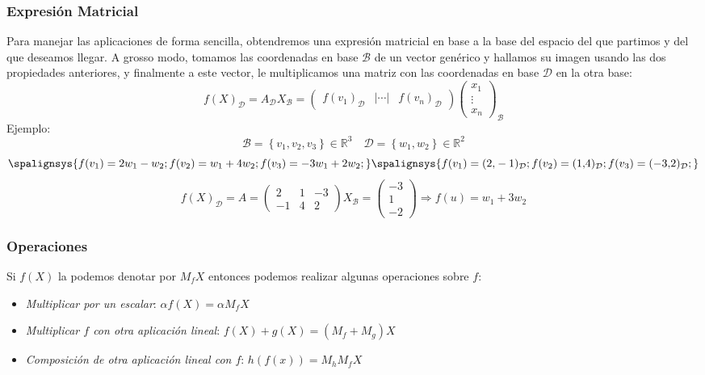 \subsubsection{Expresión Matricial}
Para manejar las aplicaciones de forma sencilla, obtendremos una expresión matricial en base a la base del espacio del que partimos y del que deseamos llegar. A grosso modo, tomamos las coordenadas en base \(\mathcal{B}\) de un vector genérico y hallamos su imagen usando las dos propiedades anteriores, y finalmente a este vector, le multiplicamos una matriz con las coordenadas en base \(\mathcal{D}\) en la otra base:
\[
        \boxed{f(X)_\mathcal{D} = A_\mathcal{D} X_\mathcal{B} = \begin{pmatrix}
                        f(v_1)_\mathcal{D} & \left | \cdots \right | & f(v_n)_\mathcal{D}
                \end{pmatrix}
                \begin{pmatrix}
                        x_1
                        \\
                        \vdots
                        \\
                        x_n
                \end{pmatrix}_\mathcal{B}}
\]
Ejemplo:
\[
        \mathcal{B} = \left\{v_1,v_2,v_3\right\} \in \mathbb{R}^3 \hspace{1em} \mathcal{D} = \left\{ w_1, w_2\right\} \in \mathbb{R}^2
\]
\[
        \spalignsys{
                f(v_1) = 2 w_1 - w_2 ;
                f(v_2) = w_1 + 4w_2  ;
                f(v_3) = -3w_1 + 2w_2;
        }
        \spalignsys{
                f(v_1) = (2\text{,} -1)_\mathcal{D};
                f(v_2) = (1\text{,} 4)_\mathcal{D};
                f(v_3) = (-3\text{,} 2)_\mathcal{D};
        }
\]
\[
        f(X)_\mathcal{D} = A = \begin{pmatrix}
                2  & 1 & -3 \\
                -1 & 4 & 2
        \end{pmatrix}
        X_\mathcal{B} = \begin{pmatrix}
                -3
                \\

                1 \\
                -2
        \end{pmatrix} \Rightarrow f(u) = w_1 + 3w_2
\]
\subsubsection{Operaciones}
Si \(f(X)\) la podemos denotar por \(M_fX\) entonces podemos realizar algunas operaciones sobre \(f\):
\begin{itemize}
        \item \textit{Multiplicar por un escalar}: \(\alpha f(X) = \alpha M_fX\)
        \item \textit{Multiplicar \(f\) con otra aplicación lineal}: \(f(X) + g(X) = (M_f + M_g)X\)
        \item \textit{Composición de otra aplicación lineal con \(f\)}: \(h(f(x)) = M_h M_f X\)
\end{itemize}
